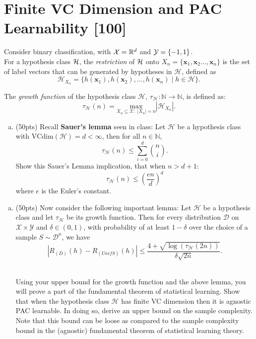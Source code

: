 \documentclass{article}
\begin{document}
\newpage


\section{Finite VC Dimension and PAC Learnability  [100]}

Consider binary classification, with ${\cal{X}} = \mathbb{R}^d$ and ${\cal Y} = \{-1,1\}$.\\

For a hypothesis class $\cal H$, the \textit{restriction} of  $\cal H$ onto $X_{n}=\{\mathbf{x}_{1},\mathbf{x}_{2}\dots,\mathbf{x}_{n}\}$ is the set of label vectors that can be
generated by hypotheses in $\mathcal{H}$, defined as 
\[\mathcal{H}_{X_{n}} = \{h(\mathbf{x}_{1}), h(\mathbf{x}_{2}), \dots, h(\mathbf{x}_{n}) \;|\; h \in \mathcal{H}\}.\]

The \textit{growth function} of the hypothesis class $\mathcal{H}$, $\tau_{\mathcal{H}}: \mathbb{N} \to \mathbb{N}$, is defined as:
\[\tau_{\mathcal{H}}(n) = \underset{ X_{n} \subseteq \mathcal{X} :\; |X_{n}|=n}{\text{max}}  |\mathcal{H}_{X_{n}}|.\]

\vspace{10mm}
\begin{enumerate}[a)]
    \item (50pts) 
    Recall \textbf{Sauer's lemma} seen in class:     Let $\mathcal{H}$ be a hypothesis class with $\text{VCdim}(\mathcal{H}) = d < \infty $, then for all $n \in \mathbb{N}$,
    $$\tau_{\mathcal{H}}(n) \leq \sum_{i=0}^d { \binom{n}{i}}.$$
    Show this Sauer's Lemma implication, that when $n>d+1$:
    $$\tau_{\mathcal{H}}(n) \leq \left(\frac{e n}{d}\right)^d $$
    where $e$ is the Euler's constant.
\end{enumerate}

\vspace{10mm}
\begin{enumerate}[b)]
    \item (50pts) Now consider the following important lemma:     Let $\mathcal{H}$ be a hypothesis class and let $\tau_{\mathcal{H}}$ be its growth function. Then for every distribution $\mathcal{D}$ on $\mathcal{X} \times \mathcal{Y}$ and $\delta \in(0,1)$, with probability of at least $1-\delta$ over the choice of a sample $S \sim \mathcal{D}^{n}$, we have
    \[|R_{(D)}\left(h\right)-R_{(Unif S)}\left(h\right)| \leq 
    \frac{ 4+\sqrt{\log{(\tau_{\mathcal{H}}(2n))}} }{\delta \sqrt{2n}}. \]
    
    ~\\
    Using your upper bound for the growth function and the above lemma, you will prove a part of the fundamental theorem of statistical learning. Show that when the hypothesis class $\mathcal{H}$ has finite VC dimension then it is agnostic PAC learnable. In doing so, derive an upper bound on the sample complexity. Note that this bound can be loose as compared to the sample complexity bound in the (agnostic) fundamental theorem of statistical learning theory.
\end{enumerate}
\end{document}
